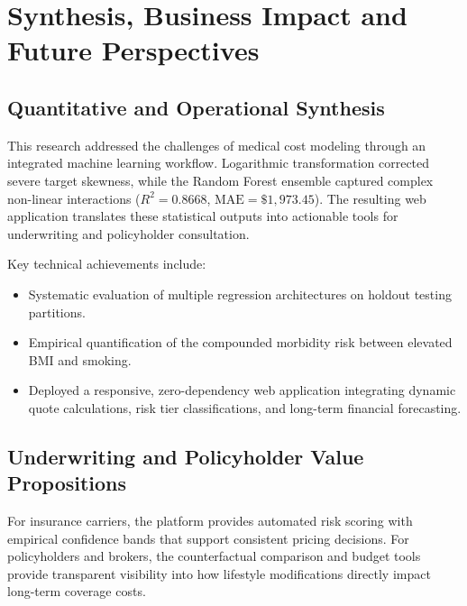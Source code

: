 \documentclass[12pt,a4paper]{report}
\begin{document}
\chapter{Synthesis, Business Impact and Future Perspectives}
\label{chap:conclusion}

\section{Quantitative and Operational Synthesis}
This research addressed the challenges of medical cost modeling through an integrated machine learning workflow. Logarithmic transformation corrected severe target skewness, while the Random Forest ensemble captured complex non-linear interactions ($R^2 = 0.8668$, $\text{MAE} = \$1,973.45$). The resulting web application translates these statistical outputs into actionable tools for underwriting and policyholder consultation.

Key technical achievements include:
\begin{itemize}
    \item Systematic evaluation of multiple regression architectures on holdout testing partitions.
    \item Empirical quantification of the compounded morbidity risk between elevated BMI and smoking.
    \item Deployed a responsive, zero-dependency web application integrating dynamic quote calculations, risk tier classifications, and long-term financial forecasting.
\end{itemize}

\section{Underwriting and Policyholder Value Propositions}
For insurance carriers, the platform provides automated risk scoring with empirical confidence bands that support consistent pricing decisions. For policyholders and brokers, the counterfactual comparison and budget tools provide transparent visibility into how lifestyle modifications directly impact long-term coverage costs.
\end{document}
